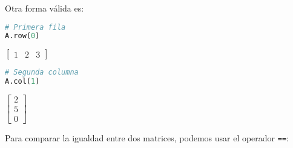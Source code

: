 \documentclass[a4,11pt]{aleph-notas}
\begin{document}
Otra forma válida es:
\begin{pycodigo}
    \begin{ipynbcodigo}\begin{lstlisting}[language=Python]
# Primera fila
A.row(0)
    \end{lstlisting}\end{ipynbcodigo}
    \begin{ipynbsalida}[2mm]
        $\displaystyle \left[\begin{matrix}1 & 2 & 3\end{matrix}\right]$
    \end{ipynbsalida}
    \begin{ipynbcodigo}\begin{lstlisting}[language=Python]
# Segunda columna
A.col(1)
    \end{lstlisting}\end{ipynbcodigo}
    \begin{ipynbsalida}[2mm]
        $\displaystyle \left[\begin{matrix}2\\5\\0\end{matrix}\right]$
    \end{ipynbsalida}
\end{pycodigo}

Para comparar la igualdad entre dos matrices, podemos usar el operador \texttt{==}:
\end{document}
